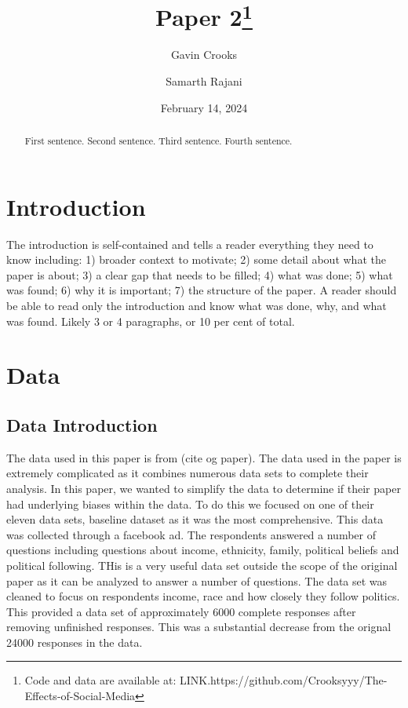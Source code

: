 \documentclass[
  letterpaper,
  DIV=11,
  numbers=noendperiod]{scrartcl}
\title{Paper 2\thanks{Code and data are available at:
LINK.https://github.com/Crooksyyy/The-Effects-of-Social-Media}}
\author{Gavin Crooks \and Samarth Rajani}
\date{February 14, 2024}
\renewcommand*\contentsname{Table of contents}
\newcommand\contentsname{Table of contents}
\begin{document}
\maketitle
\begin{abstract}
First sentence. Second sentence. Third sentence. Fourth sentence.
\end{abstract}

\renewcommand*\contentsname{Table of contents}
{
\hypersetup{linkcolor=}
\setcounter{tocdepth}{3}
\tableofcontents
}
\section{Introduction}\label{introduction}

The introduction is self-contained and tells a reader everything they
need to know including: 1) broader context to motivate; 2) some detail
about what the paper is about; 3) a clear gap that needs to be filled;
4) what was done; 5) what was found; 6) why it is important; 7) the
structure of the paper. A reader should be able to read only the
introduction and know what was done, why, and what was found. Likely 3
or 4 paragraphs, or 10 per cent of total.

\section{Data}\label{sec-data}

\subsection{Data Introduction}\label{sec-dataintro}

The data used in this paper is from (cite og paper). The data used in
the paper is extremely complicated as it combines numerous data sets to
complete their analysis. In this paper, we wanted to simplify the data
to determine if their paper had underlying biases within the data. To do
this we focused on one of their eleven data sets, baseline dataset as it
was the most comprehensive. This data was collected through a facebook
ad. The respondents answered a number of questions including questions
about income, ethnicity, family, political beliefs and political
following. THis is a very useful data set outside the scope of the
original paper as it can be analyzed to answer a number of questions.
The data set was cleaned to focus on respondents income, race and how
closely they follow politics. This provided a data set of approximately
6000 complete responses after removing unfinished responses. This was a
substantial decrease from the orignal 24000 responses in the data.
\end{document}

